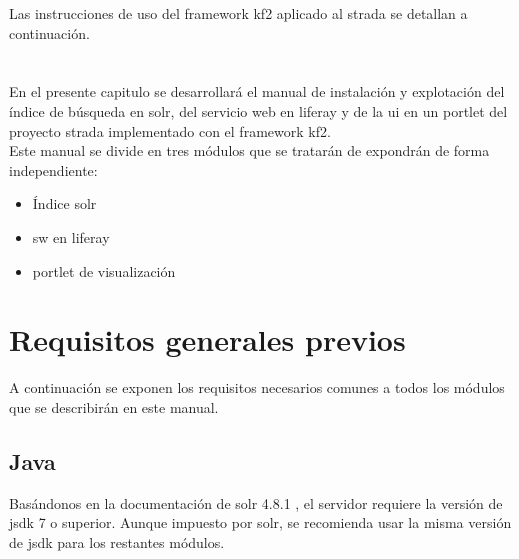 

Las instrucciones de uso del \gls{framework} \gls{kf2} aplicado al \gls{strada} se detallan a continuación.

\section{}

En el presente capitulo se desarrollará el manual de instalación y explotación del índice de búsqueda en \gls{solr}, del servicio web  en \gls{liferay} y de la \gls{ui} en un \gls{portlet} del proyecto \gls{strada} implementado con el \gls{framework} \gls{kf2}.\\



Este manual se divide en tres módulos que se tratarán de expondrán de forma independiente:
\begin{itemize}
	\item Índice \gls{solr}
	\item \Gls{sw} en \gls{liferay}
	\item \Gls{portlet} de visualización
\end{itemize}

\section{Requisitos generales previos}
A continuación se exponen los requisitos necesarios comunes a todos los módulos que se describirán en este manual.

\subsection{Java}
Basándonos en la documentación de \gls{solr} 4.8.1 \cite{solrinstall}, el servidor requiere la versión de \gls{jsdk} 7 o superior. Aunque impuesto por \gls{solr}, se recomienda usar la misma versión de \gls{jsdk} para los restantes módulos.\\


